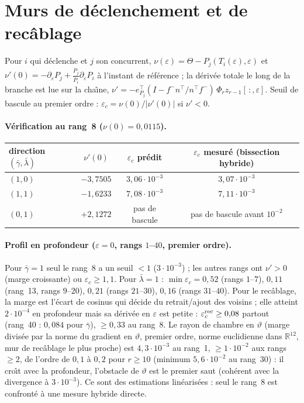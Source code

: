 \documentclass[11pt,a4paper]{article}
\theoremstyle{remark}
\newcommand{\R}{\mathbb R}
\newcommand{\vth}{\vartheta}
\begin{document}
\section{Murs de d\'eclenchement et de recâblage}
Pour $i$ qui d\'eclenche et $j$ son concurrent, $\nu(\varepsilon)=\Theta-P_j(T_i(\varepsilon),\varepsilon)$ et $\nu'(0)=-\partial_\varepsilon P_j+\frac{\dot P_j}{\dot P_i}\partial_\varepsilon P_i$ \`a l'instant de r\'ef\'erence ; la d\'eriv\'ee totale le long de la branche est lue sur la cha\^{\i}ne, $\nu'=-e_{P_j}^\top(I-f^-n^\top/n^\top f^-)\,\Phi_r z_{r-1}[\,:,\varepsilon]$. Seuil de bascule au premier ordre : $\varepsilon_c=\nu(0)/\lvert\nu'(0)\rvert$ si $\nu'<0$.

\paragraph{V\'erification au rang~8 ($\nu(0)=0{,}0115$).}
\begin{center}\small
\begin{tabular}{lccc}
\toprule
direction $(\bar\gamma,\bar\lambda)$ & $\nu'(0)$ & $\varepsilon_c$ pr\'edit & $\varepsilon_c$ mesur\'e (bissection hybride)\\
\midrule
$(1,0)$ & $-3{,}7505$ & $3{,}06\cdot10^{-3}$ & $3{,}07\cdot10^{-3}$\\
$(1,1)$ & $-1{,}6233$ & $7{,}08\cdot10^{-3}$ & $7{,}11\cdot10^{-3}$\\
$(0,1)$ & $+2{,}1272$ & pas de bascule & pas de bascule avant $10^{-2}$\\
\bottomrule
\end{tabular}
\end{center}
\paragraph{Profil en profondeur ($\varepsilon=0$, rangs $1$--$40$, premier ordre).} Pour $\bar\gamma=1$ seul le rang~8 a un seuil $<1$ ($3\cdot10^{-3}$) ; les autres rangs ont $\nu'>0$ (marge croissante) ou $\varepsilon_c\ge1{,}1$. Pour $\bar\lambda=1$ : $\min\varepsilon_c=0{,}52$ (rangs $1$--$7$), $0{,}11$ (rang~13, rangs $9$--$20$), $0{,}21$ (rangs $21$--$30$), $0{,}16$ (rangs $31$--$40$). Pour le recâblage, la marge est l'\'ecart de cosinus qui d\'ecide du retrait/ajout des voisins ; elle atteint $2\cdot10^{-4}$ en profondeur mais sa d\'eriv\'ee en $\varepsilon$ est petite : $\varepsilon_c^{\rm rec}\ge0{,}08$ partout (rang~40 : $0{,}084$ pour $\bar\gamma$), $\ge0{,}33$ au rang~8. Le rayon de chambre en $\vth$ (marge divis\'ee par la norme du gradient en $\vth$, premier ordre, norme euclidienne dans $\R^{12}$, mur de recâblage le plus proche) est $4{,}3\cdot10^{-3}$ au rang~1, $\ge1\cdot10^{-2}$ aux rangs $\ge2$, de l'ordre de $0{,}1$ \`a $0{,}2$ pour $r\ge10$ (minimum $5{,}6\cdot10^{-2}$ au rang~30) : il cro\^{\i}t avec la profondeur, l'obstacle de $\vth$ est le premier saut (coh\'erent avec la divergence \`a $3\cdot10^{-3}$). Ce sont des estimations lin\'earis\'ees : seul le rang~8 est confront\'e \`a une mesure hybride directe.
\end{document}
